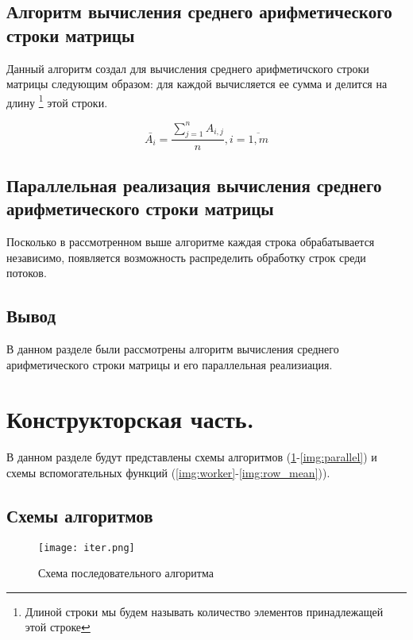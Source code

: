 \subsection{Алгоритм вычисления среднего арифметического строки матрицы}

Данный алгоритм создал для вычисления среднего арифметичского строки матрицы следующим образом: для каждой вычисляется ее сумма и делится на длину \footnote{Длиной строки мы будем называть количество элементов принадлежащей этой строке} этой строки.

\begin{equation}
    \bar{A_i} = \frac{\displaystyle\sum_{j = 1}^{n} A_{i, j}}{n}, i = \overline{1, m}
\end{equation}

\subsection{Параллельная реализация вычисления среднего арифметического строки матрицы}

Посколько в рассмотренном выше алгоритме каждая строка обрабатывается независимо, появляется возможность распределить обработку строк среди потоков.

\subsection{Вывод}

В данном разделе были рассмотрены алгоритм вычисления среднего арифметического строки матрицы и его параллельная реализиация.

\section{Конструкторская часть.}

В данном разделе будут представлены схемы алгоритмов (\ref{img:iter}-\ref{img:parallel}) и схемы вспомогательных функций (\ref{img:worker}-\ref{img:row_mean})).

\subsection{Схемы алгоритмов}

\begin{figure}[hp]
    \centering
    \texttt{[image: iter.png]}
    \caption{Схема последовательного алгоритма}
    \label{img:iter}
\end{figure}

